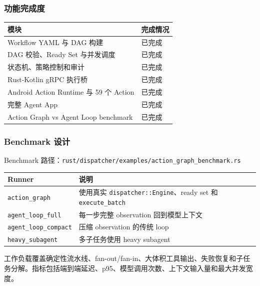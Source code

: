 \documentclass[aspectratio=169]{ctexbeamer}
\newcommand{\code}[1]{\texttt{#1}}
\begin{document}
\begin{frame}
  \frametitle{功能完成度}
  \scriptsize
  \begin{tabularx}{\textwidth}{p{}p{}}
    \toprule
    模块 & 完成情况 \\
    \midrule
    Workflow YAML 与 DAG 构建 & 已完成 \\
    DAG 校验、Ready Set 与并发调度 & 已完成 \\
    状态机、策略控制和审计 & 已完成 \\
    Rust-Kotlin gRPC 执行桥 & 已完成 \\
    Android Action Runtime 与 59 个 Action & 已完成 \\
    完整 Agent App & 已完成 \\
    Action Graph vs Agent Loop benchmark & 已完成 \\
    \bottomrule
  \end{tabularx}
\end{frame}

\begin{frame}
  \frametitle{Benchmark 设计}
  Benchmark 路径：\code{rust/dispatcher/examples/action\_graph\_benchmark.rs}

  \vspace{0.4em}
  \scriptsize
  \begin{tabularx}{\textwidth}{p{}Y}
    \toprule
    Runner & 说明 \\
    \midrule
    \code{action\_graph} & 使用真实 \code{dispatcher::Engine}、ready set 和 \code{execute\_batch} \\
    \code{agent\_loop\_full} & 每一步完整 observation 回到模型上下文 \\
    \code{agent\_loop\_compact} & 压缩 observation 的传统 loop \\
    \code{heavy\_subagent} & 多子任务使用 heavy subagent \\
    \bottomrule
  \end{tabularx}

  \vspace{0.6em}
  \normalsize
  工作负载覆盖确定性流水线、fan-out/fan-in、大体积工具输出、失败恢复和子任务分解。指标包括端到端延迟、p95、模型调用次数、上下文输入量和最大并发宽度。
\end{frame}
\end{document}
